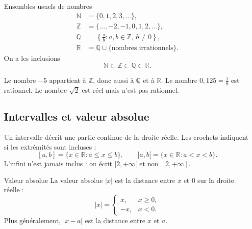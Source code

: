 \documentclass[12pt,a4paper,openany]{book}
\newcommand{\R}{\mathbb{R}}
\newcommand{\N}{\mathbb{N}}
\newcommand{\Z}{\mathbb{Z}}
\newcommand{\Q}{\mathbb{Q}}
\newcommand{\abs}[1]{\left\lvert #1\right\rvert}
\begin{document}
\begin{definition}{Ensembles usuels de nombres}{}
\begin{align*}
\N&=\{0,1,2,3,\ldots\},\\
\Z&=\{\ldots,-2,-1,0,1,2,\ldots\},\\
\Q&=\left\{\frac ab:a,b\in\Z,\ b\neq0\right\},\\
\R&=\Q\cup\{\text{nombres irrationnels}\}.
\end{align*}
On a les inclusions
\[
\N\subset\Z\subset\Q\subset\R.
\]
\end{definition}

\begin{center}
\end{center}

\begin{examplebox}
Le nombre $-5$ appartient à $\Z$, donc aussi à $\Q$ et à $\R$. Le nombre $0{,}125=\frac18$ est rationnel. Le nombre $\sqrt2$ est réel mais n'est pas rationnel.
\end{examplebox}

\subsection{Intervalles et valeur absolue}

Un intervalle décrit une partie continue de la droite réelle. Les crochets indiquent si les extrémités sont incluses :
\[
[a,b]=\{x\in\R:a\le x\le b\},\qquad ]a,b[=\{x\in\R:a<x<b\}.
\]
L'infini n'est jamais inclus : on écrit $[2,+\infty[$ et non $[2,+\infty]$.

\begin{definition}{Valeur absolue}{}
La valeur absolue $\abs{x}$ est la distance entre $x$ et $0$ sur la droite réelle :
\[
\abs{x}=\begin{cases}x,&x\ge0,\\-x,&x<0.\end{cases}
\]
Plus généralement, $\abs{x-a}$ est la distance entre $x$ et $a$.
\end{definition}
\end{document}

